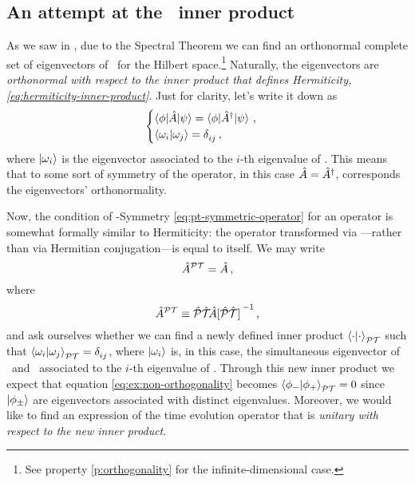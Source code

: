         \subsection{An attempt at the \PT\ inner product}
            As we saw in , due to the Spectral Theorem we can find an orthonormal complete set of eigenvectors of \hA\ for the Hilbert space.\footnote{See property \ref{p:orthogonality} for the infinite-dimensional case.} Naturally, the eigenvectors are \emph{orthonormal with respect to the inner product that defines Hermiticity, \eqref{eq:hermiticity-inner-product}}. Just for clarity, let's write it down as
            \begin{equation*}
                \begin{cases}
                    \bra{\phi} \! \hA \! \ket{\psi} = \bra{\phi} \! \hA^\dag \! \ket{\psi}
                    \mycomma \\
                    \braket{\omega_i}{\omega_j} = \tensor{\delta}{_i_j}
                    \mycomma
                \end{cases}
            \end{equation*}
            where $\ket{\omega_i}$ is the eigenvector associated to the $i$-th eigenvalue of \hA. This means that to some sort of symmetry of the operator, in this case $\hat{A} = \hat{A}^\dag$, corresponds the eigenvectors' orthonormality.

            Now, the condition of \PT-Symmetry \eqref{eq:pt-symmetric-operator} for an operator is somewhat formally similar to Hermiticity: the operator transformed via \hPT---rather than via Hermitian conjugation---is equal to itself. We may write
            \begin{equation*}
                \hat{A}^{\mathcal{P}\mathcal{T}} = \hat{A}
                \,\text{,}
            \end{equation*}
            where
            \begin{equation*}
                \hA^{\PT} \equiv \PTtransform{\hA}
                \mycomma
            \end{equation*}
            and ask ourselves whether we can find a newly defined inner product $\braket{\cdot}{\cdot}_{\mathcal{P}\mathcal{T}}$ such that $\braket{\omega_i}{\omega_j}_{\PT}= \tensor{\delta}{_i_j}$, where $\ket{\omega_i}$ is, in this case, the simultaneous eigenvector of \hA\ and \hPT\ associated to the $i$-th eigenvalue of \hA. Through this new inner product we expect that equation \eqref{eq:ex:non-orthogonality} becomes $\braket{\phi_-}{\phi_+}_{\mathcal{P}\mathcal{T}} = 0$ since $\ket{\phi_\pm}$ are eigenvectors associated with distinct eigenvalues. Moreover, we would like to find an expression of the time evolution operator that is \emph{unitary with respect to the new inner product}.

